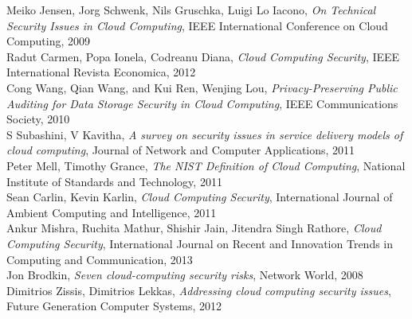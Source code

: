 \documentclass[a4paper, 8pt]{article} %
\begin{document}
\begin{thebibliography}{1}
Meiko Jensen, Jorg Schwenk, Nils Gruschka, Luigi Lo Iacono, \emph{On Technical Security Issues in Cloud Computing}, \relax IEEE International Conference on Cloud Computing, 2009\\
Radut Carmen, Popa Ionela, Codreanu Diana, \emph{Cloud Computing Security}, \relax IEEE International Revista Economica, 2012\\
Cong Wang, Qian Wang, and Kui Ren, Wenjing Lou, \emph{Privacy-Preserving Public Auditing for Data Storage Security in Cloud Computing}, \relax IEEE Communications Society, 2010\\
S Subashini, V Kavitha, \emph{A survey on security issues in service delivery models of cloud computing}, \relax Journal of Network and Computer Applications, 2011\\
Peter Mell, Timothy Grance, \emph{The NIST Definition of Cloud Computing}, \relax National Institute of Standards and Technology, 2011\\
Sean Carlin, Kevin Karlin, \emph{Cloud Computing Security}, \relax International Journal of Ambient Computing and Intelligence, 2011\\
Ankur Mishra, Ruchita Mathur, Shishir Jain, Jitendra Singh Rathore, \emph{Cloud Computing Security}, \relax International Journal on Recent and Innovation Trends in Computing and Communication, 2013\\
Jon Brodkin, \emph{Seven cloud-computing security risks}, \relax Network World, 2008\\
Dimitrios Zissis, Dimitrios Lekkas, \emph{Addressing cloud computing security issues}, \relax Future Generation Computer Systems, 2012\\

\end{thebibliography}

%
%
\end{document}
